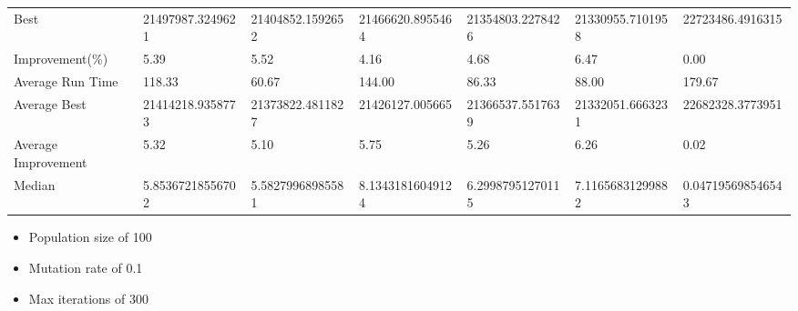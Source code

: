 \begin{table}[H]
{\begin{tabular}{lllllll}
\cellcolor[HTML]{ECF4FF}Best                & 21497987.3249621 & 21404852.1592652 & 21466620.8955464 & 21354803.2278426 & 21330955.7101958 & 22723486.4916315  \\
\cellcolor[HTML]{ECF4FF}Improvement(\%)     & 5.39             & 5.52             & 4.16             & 4.68             & 6.47             & 0.00              \\
\rowcolor[HTML]{CBCEFB} 
\cellcolor[HTML]{DAE8FC}Average Run Time    & 118.33           & 60.67            & 144.00           & 86.33            & 88.00            & 179.67            \\
\rowcolor[HTML]{CBCEFB} 
\cellcolor[HTML]{DAE8FC}Average Best        & 21414218.9358773 & 21373822.4811827 & 21426127.005665  & 21366537.5517639 & 21332051.6663231 & 22682328.3773951  \\
\rowcolor[HTML]{CBCEFB} 
\cellcolor[HTML]{DAE8FC}Average Improvement & 5.32             & 5.10             & 5.75             & 5.26             & 6.26             & 0.02              \\
\rowcolor[HTML]{CBCEFB} 
\cellcolor[HTML]{DAE8FC}Median              & 5.85367218556702 & 5.58279968985581 & 8.13431816049124 & 6.29987951270115 & 7.11656831299882 & 0.047195698546543
\end{tabular}%
}
\end{table}

\begin{itemize}
  \item Population size of 100
  \item Mutation rate of 0.1
  \item Max iterations of 300
\end{itemize}

